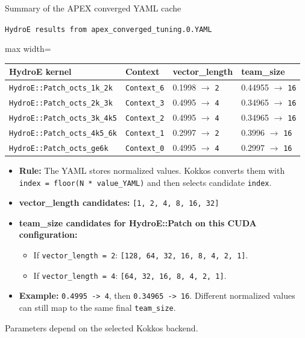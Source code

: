 \documentclass[11pt]{beamer}
\begin{document}
\begin{frame}[t]{Summary of the APEX converged YAML cache}
\begin{beamerboxesrounded}[upper=tuner title,lower=tuner body,width=\linewidth,shadow=false]{%
\texttt{\scriptsize HydroE results from apex\_converged\_tuning.0.YAML}}
{\scriptsize\color{black}
\begin{adjustbox}{max width=\linewidth}
\begin{tabular}{@{}llll@{}}
\toprule
HydroE kernel & Context & vector\_length & team\_size \\
\midrule
\texttt{HydroE::Patch\_octs\_1k\_2k} & \texttt{Context\_6} & 0.1998 $\rightarrow$ \texttt{2} & 0.44955 $\rightarrow$ \texttt{16} \\
\texttt{HydroE::Patch\_octs\_2k\_3k} & \texttt{Context\_3} & 0.4995 $\rightarrow$ \texttt{4} & 0.34965 $\rightarrow$ \texttt{16} \\
\texttt{HydroE::Patch\_octs\_3k\_4k5} & \texttt{Context\_2} & 0.4995 $\rightarrow$ \texttt{4} & 0.34965 $\rightarrow$ \texttt{16} \\
\texttt{HydroE::Patch\_octs\_4k5\_6k} & \texttt{Context\_1} & 0.2997 $\rightarrow$ \texttt{2} & 0.3996 $\rightarrow$ \texttt{16} \\
\texttt{HydroE::Patch\_octs\_ge6k} & \texttt{Context\_0} & 0.4995 $\rightarrow$ \texttt{4} & 0.2997 $\rightarrow$ \texttt{16} \\
\bottomrule
\end{tabular}
\end{adjustbox}}
\end{beamerboxesrounded}

\vspace{0.08em}
{\scriptsize
\begin{itemize}\itemsep0.08em
  \item \textbf{Rule:} The YAML stores normalized values. Kokkos converts them with \texttt{index = floor(N * value\_YAML)} and then selects candidate \texttt{index}.
  \item \textbf{vector\_length candidates:} \texttt{[1, 2, 4, 8, 16, 32]}
  \item \textbf{team\_size candidates for HydroE::Patch on this CUDA configuration:} 
  \begin{itemize}\itemsep0.03em
  \item[--] If \texttt{vector\_length = 2}: \texttt{[128, 64, 32, 16, 8, 4, 2, 1]}. 
  \item[--] If \texttt{vector\_length = 4}: \texttt{[64, 32, 16, 8, 4, 2, 1]}.
  \end{itemize}
  \item \textbf{Example:} \texttt{0.4995 -> 4}, then \texttt{0.34965 -> 16}. Different normalized values can still map to the same final \texttt{team\_size}.
\end{itemize}
{\tiny Parameters depend on the selected Kokkos backend.}}
\end{frame}
\end{document}
